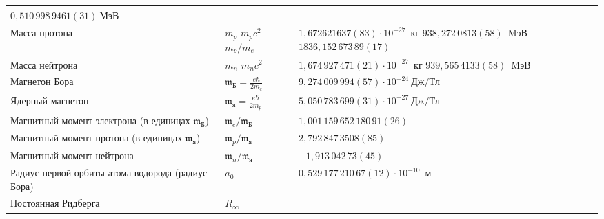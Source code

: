 \begin{labsupplement}
\begin{longtable}{p{46mm}>{\centering}p{14mm}p{45mm}}
                               $0,510\,998\,9461(31)~МэВ$               \\ \hline
Масса протона    & $m_p$ \newline
                   $m_pc^2$ \newline
                   $m_p/m_e$
                 & $1,672 621 637(83)\cdot 10^{-27}$~кг\newline
                   $938,272\,0813(58)$~MэВ \newline
                   $1836,152\,673\,89(17)$                              \\ \hline
Масса нейтрона   & $m_n$ \newline
                   $m_nc^2$
                 & $1,674\,927\,471(21)\cdot 10^{-27}$~кг\newline
                   $939,565\,4133(58)$~MэВ                              \\ \hline
Магнетон Бора    & $\mathfrak{m}_{Б}=\frac{e\hbar}{2m_e}$
                 & $9,274\, 009\,994(57)\cdot 10^{-24}~Дж/Тл$       \bigstrut\\ \hline
Ядерный магнетон & $\mathfrak{m}_{я}=\frac{e\hbar}{2m_p}$
                 & $5,050\,783\,699(31)\cdot 10^{-27}~Дж/Тл$        \bigstrut\\ \hline
Магнитный момент электрона\newline
(в единицах $\mathfrak{m}_{Б}$)
                 & $\mathfrak{m}_e/\mathfrak{m}_{Б}$
                 & $1,001\,159\,652\,180\,91(26)$                       \\ \hline
Магнитный момент протона\newline
(в единицах $\mathfrak{m}_{я}$)
                 & $\mathfrak{m}_p/\mathfrak{m}_{я}$
                 & $2,792\,847\,3508(85)$                               \\ \hline
Магнитный момент нейтрона
                 & $\mathfrak{m}_n/\mathfrak{m}_{я}$
                 & $-1,913\,042\,73(45)$                                \\ \hline
Радиус первой орбиты\newline
атома водорода (радиус Бора)
                 & $a_0$
                 & $0,529\,177\,210\,67(12)\cdot 10^{-10}$~м                \\ \hline
Постоянная Ридберга
                 & $R_{\infty}$ \newline

\end{longtable}
\end{labsupplement}
